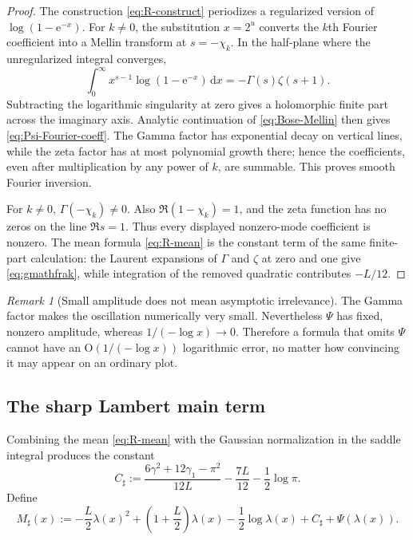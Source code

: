 \documentclass[11pt]{article}
\numberwithin{equation}{section}
\theoremstyle{definition}
\theoremstyle{remark}
\newtheorem{remark}[theorem]{Remark}
\newcommand{\dd}{\,\mathrm d}
\newcommand{\e}{\mathrm e}
\newcommand{\Oh}{\mathrm O}
\begin{document}
\begin{proof}
The construction \eqref{eq:R-construct} periodizes a regularized version of
$\log(1-\e^{-x})$.  For $k\ne0$, the substitution $x=2^u$ converts the $k$th
Fourier coefficient into a Mellin transform at
$s=-\chi_k$.  In the half-plane where the unregularized integral converges,
\begin{equation}\label{eq:Bose-Mellin}
 \int_0^\infty x^{s-1}\log(1-\e^{-x})\dd x
 =-\Gamma(s)\zeta(s+1).
\end{equation}
Subtracting the logarithmic singularity at zero gives a holomorphic finite
part across the imaginary axis.  Analytic continuation of
\eqref{eq:Bose-Mellin} then gives \eqref{eq:Psi-Fourier-coeff}.  The Gamma
factor has exponential decay on vertical lines, while the zeta factor has at
most polynomial growth there; hence the coefficients, even after
multiplication by any power of $k$, are summable.  This proves smooth Fourier
inversion.

For $k\ne0$, $\Gamma(-\chi_k)\ne0$.  Also
$\Re(1-\chi_k)=1$, and the zeta function has no zeros on the line
$\Re s=1$.  Thus every displayed nonzero-mode coefficient is nonzero.
The mean formula \eqref{eq:R-mean} is the constant term of the same
finite-part calculation: the Laurent expansions of $\Gamma$ and $\zeta$ at
zero and one give \eqref{eq:gmathfrak}, while integration of the removed
quadratic contributes $-L/12$.
\end{proof}

\begin{remark}[Small amplitude does not mean asymptotic irrelevance]
The Gamma factor makes the oscillation numerically very small.  Nevertheless
$\Psi$ has fixed, nonzero amplitude, whereas $1/(-\log x)\to0$.  Therefore a
formula that omits $\Psi$ cannot have an $\Oh(1/(-\log x))$ logarithmic error,
no matter how convincing it may appear on an ordinary plot.
\end{remark}

\subsection{The sharp Lambert main term}

Combining the mean \eqref{eq:R-mean} with the Gaussian normalization in the
saddle integral produces the constant
\begin{equation}\label{eq:Csharp}
 C_\sharp:=
 \frac{6\gamma^2+12\gamma_1-\pi^2}{12L}
 -\frac{7L}{12}-\frac12\log\pi.
\end{equation}
Define
\begin{equation}\label{eq:Msharp}
\boxed{
 M_\sharp(x):=-\frac L2\lambda(x)^2
 +\left(1+\frac L2\right)\lambda(x)
 -\frac12\log\lambda(x)+C_\sharp+\Psi(\lambda(x)).}
\end{equation}
\end{document}
